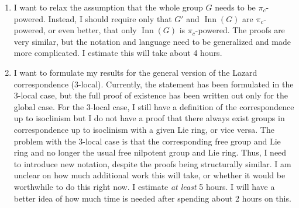 \documentclass[10pt]{amsart}
\begin{document}
\begin{enumerate}

\item I want to relax the assumption that the whole group $G$ needs to
  be $\pi_c$-powered. Instead, I should require only that $G'$ and
  $\operatorname{Inn}(G)$ are $\pi_c$-powered, or even better, that
  only $\operatorname{Inn}(G)$ is $\pi_c$-powered. The proofs are very
  similar, but the notation and language need to be generalized and
  made more complicated. I estimate this will take about 4 hours.
\item I want to formulate my results for the general version of the
  Lazard correspondence ($3$-local). Currently, the statement has been
  formulated in the $3$-local case, but the full proof of existence
  has been written out only for the global case. For the $3$-local
  case, I still have a definition of the correspondence up to
  isoclinism but I do not have a proof that there always exist groups
  in correspondence up to isoclinism with a given Lie ring, or vice
  versa. The problem with the $3$-local case is that the corresponding
  free group and Lie ring and no longer the usual free nilpotent group
  and Lie ring. Thus, I need to introduce new notation, despite the
  proofs being structurally similar. I am unclear on how much
  additional work this will take, or whether it would be worthwhile to
  do this right now. I estimate {\em at least} 5 hours. I will have a
  better idea of how much time is needed after spending about 2 hours
  on this.
\end{enumerate}
\end{document}
